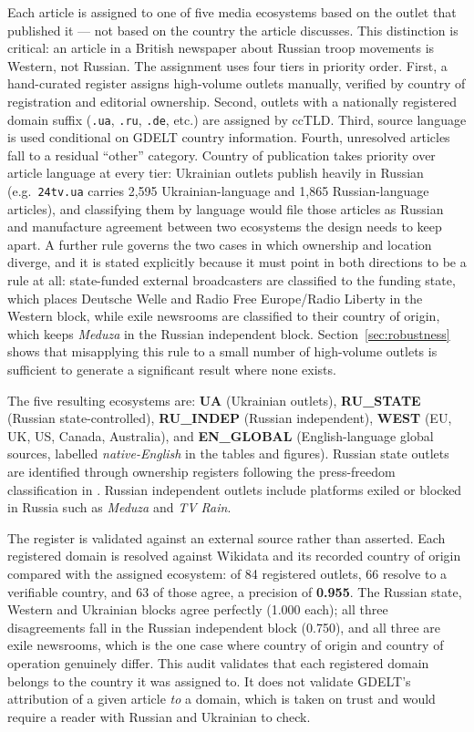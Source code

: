 \documentclass[12pt,a4paper]{article}
\begin{document}
Each article is assigned to one of five media ecosystems based on the outlet that published it --- not based on the country the article discusses. This distinction is critical: an article in a British newspaper about Russian troop movements is Western, not Russian. The assignment uses four tiers in priority order. First, a hand-curated register assigns high-volume outlets manually, verified by country of registration and editorial ownership. Second, outlets with a nationally registered domain suffix (\texttt{.ua}, \texttt{.ru}, \texttt{.de}, etc.) are assigned by ccTLD. Third, source language is used conditional on GDELT country information. Fourth, unresolved articles fall to a residual ``other'' category. Country of publication takes priority over article language at every tier: Ukrainian outlets publish heavily in Russian (e.g.\ \texttt{24tv.ua} carries 2,595 Ukrainian-language and 1,865 Russian-language articles), and classifying them by language would file those articles as Russian and manufacture agreement between two ecosystems the design needs to keep apart. A further rule governs the two cases in which ownership and location diverge, and it is stated explicitly because it must point in both directions to be a rule at all: state-funded external broadcasters are classified to the funding state, which places Deutsche Welle and Radio Free Europe/Radio Liberty in the Western block, while exile newsrooms are classified to their country of origin, which keeps \textit{Meduza} in the Russian independent block. Section~\ref{sec:robustness} shows that misapplying this rule to a small number of high-volume outlets is sufficient to generate a significant result where none exists.

The five resulting ecosystems are: \textbf{UA} (Ukrainian outlets), \textbf{RU\_STATE} (Russian state-controlled), \textbf{RU\_INDEP} (Russian independent), \textbf{WEST} (EU, UK, US, Canada, Australia), and \textbf{EN\_GLOBAL} (English-language global sources, labelled \textit{native-English} in the tables and figures). Russian state outlets are identified through ownership registers following the press-freedom classification in \citet{bondarenko2024}. Russian independent outlets include platforms exiled or blocked in Russia such as \textit{Meduza} and \textit{TV Rain}.

The register is validated against an external source rather than asserted. Each registered domain is resolved against Wikidata and its recorded country of origin compared with the assigned ecosystem: of 84 registered outlets, 66 resolve to a verifiable country, and 63 of those agree, a precision of \textbf{0.955}. The Russian state, Western and Ukrainian blocks agree perfectly (1.000 each); all three disagreements fall in the Russian independent block (0.750), and all three are exile newsrooms, which is the one case where country of origin and country of operation genuinely differ. This audit validates that each registered domain belongs to the country it was assigned to. It does not validate GDELT's attribution of a given article \textit{to} a domain, which is taken on trust and would require a reader with Russian and Ukrainian to check.
\end{document}
